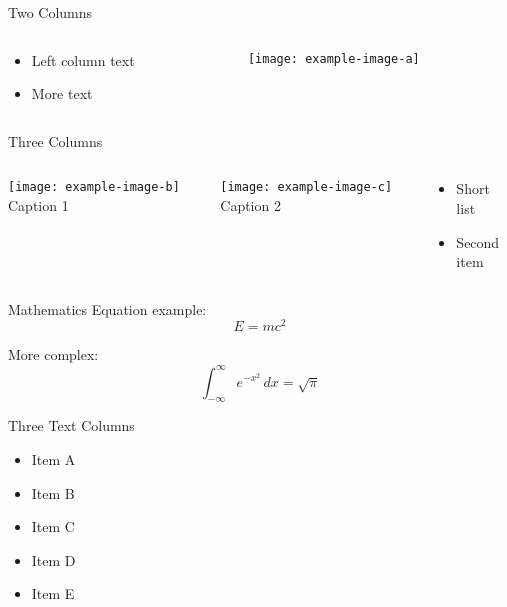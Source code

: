 \documentclass[aspectratio=43]{beamer}
\begin{document}
\begin{frame}{Two Columns}
\begin{columns}[T]
  \begin{column}{0.48\textwidth}
    \begin{itemize}
      \item Left column text
      \item More text
    \end{itemize}
  \end{column}
  \begin{column}{0.48\textwidth}
    \texttt{[image: example-image-a]}
  \end{column}
\end{columns}
\end{frame}

\begin{frame}{Three Columns}
\begin{columns}[T]
  \begin{column}{0.3\textwidth}
    \texttt{[image: example-image-b]}
    \centering\small Caption 1
  \end{column}
  \begin{column}{0.3\textwidth}
    \texttt{[image: example-image-c]}
    \centering\small Caption 2
  \end{column}
  \begin{column}{0.3\textwidth}
    \begin{itemize}
      \item Short list
      \item Second item
    \end{itemize}
  \end{column}
\end{columns}
\end{frame}

\begin{frame}{Mathematics}
Equation example:
\[
E = mc^2
\]

More complex:
\[
\int_{-\infty}^{\infty} e^{-x^2}\,dx = \sqrt{\pi}
\]
\end{frame}

\begin{frame}{Three Text Columns}
\begin{multicols}{3}
\begin{itemize}
  \item Item A
  \item Item B
  \item Item C
  \item Item D
  \item Item E
\end{itemize}
\end{multicols}
\end{frame}
\end{document}
